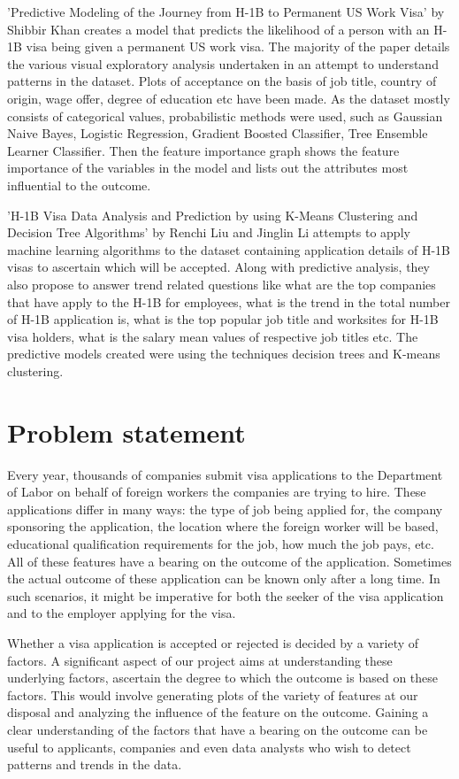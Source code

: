 \documentclass[conference]{IEEEtran}
\begin{document}
'Predictive Modeling of the Journey from H-1B to Permanent US Work Visa' by Shibbir Khan creates a model that predicts the likelihood of a person with an H-1B visa being given a permanent US work visa. The majority of the paper details the various visual exploratory analysis undertaken in an attempt to understand patterns in the dataset. Plots of acceptance on the basis of job title, country of origin, wage offer, degree of education etc have been made. As the dataset mostly consists of categorical values, probabilistic methods were used, such as Gaussian Naive Bayes, Logistic Regression, Gradient Boosted Classifier, Tree Ensemble Learner Classifier. Then the feature importance graph shows the feature importance of the variables in the model and lists out the attributes most influential to the outcome.

'H-1B Visa Data Analysis and Prediction by using K-Means Clustering and Decision Tree Algorithms' by Renchi Liu and Jinglin Li \cite{github} attempts to apply machine learning algorithms to the dataset containing application details of H-1B visas to ascertain which will be accepted. Along with predictive analysis, they also propose to answer trend related questions like what are the top companies that have apply to the H-1B for employees, what is the trend in the total number of H-1B application is, what is the top popular job title and worksites for H-1B visa holders, what is the salary mean values of respective job titles etc. The predictive models created were using the techniques decision trees and K-means clustering. 

\section{Problem statement}
Every year, thousands of companies submit visa applications to the Department of Labor on behalf of foreign workers the companies are trying to hire. These applications differ in many ways: the type of job being applied for, the company sponsoring the application, the location where the foreign worker will be based, educational qualification requirements for the job, how much the job pays, etc. All of these features have a bearing on the outcome of the application. Sometimes the actual outcome of these application can be known only after a long time. In such scenarios, it might be imperative for both the seeker of the visa application and to the employer applying for the visa.

Whether a visa application is accepted or rejected is decided by a variety of factors. A significant aspect of our project aims at understanding these underlying factors, ascertain the degree to which the outcome is based on these factors. This would involve generating plots of the variety of features at our disposal and analyzing the influence of the feature on the outcome. Gaining a clear understanding of the factors that have a bearing on the outcome can be useful to applicants, companies and even data analysts who wish to detect patterns and trends in the data.
\end{document}
